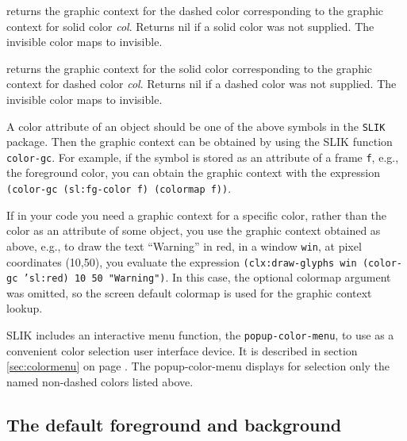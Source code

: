\documentclass[twoside,openright,11pt]{report}
\newcommand{\tp}[1]{\texttt{#1}}
\begin{document}
{returns the graphic context for the dashed color corresponding to the
graphic context for solid color \textit{col}.  Returns nil if a solid
color was not supplied.  The invisible color maps to invisible.}

{returns the graphic context for the solid color corresponding to the
graphic context for dashed color \textit{col}.  Returns nil if a
dashed color was not supplied.  The invisible color maps to
invisible.}

A color attribute of an object should be one of the above symbols in
the \tp{SLIK} package.  Then the graphic context can be obtained by
using the SLIK function \tp{color-gc}.  For example, if the
symbol is stored as an attribute of a frame \tp{f}, e.g., the
foreground color, you can obtain the graphic context with the
expression \tp{(color-gc~(sl:fg-color~f)~(colormap~f))}.

If in your code you need a graphic context for a specific color,
rather than the color as an attribute of some object, you use the
graphic context obtained as above, e.g., to draw the text ``Warning''
in red, in a window \tp{win}, at pixel coordinates (10,50), you
evaluate the expression \tp{(clx:draw-glyphs win (color-gc 'sl:red) 10
50 "Warning")}.  In this case, the optional colormap argument was
omitted, so the screen default colormap is used for the graphic
context lookup.

SLIK includes an interactive menu function, the \tp{popup-color-menu},
to use as a convenient color selection user interface device.  It is
described in section \ref{sec:colormenu} on page
\pageref{sec:colormenu}.  The popup-color-menu displays for selection
only the named non-dashed colors listed above.

\subsection{The default foreground and background}
\end{document}

